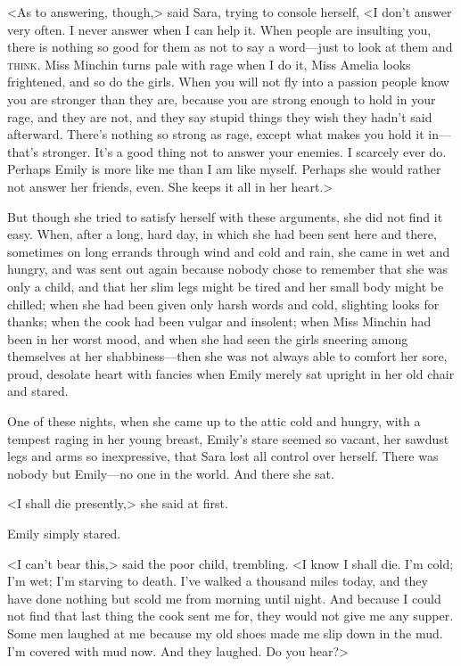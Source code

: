 <As to answering, though,> said Sara, trying to console herself, <I don't answer very often. I never answer when I can help it. When people are insulting you, there is nothing so good for them as not to say a word—just to look at them and \textsc{think}. Miss Minchin turns pale with rage when I do it, Miss Amelia looks frightened, and so do the girls. When you will not fly into a passion people know you are stronger than they are, because you are strong enough to hold in your rage, and they are not, and they say stupid things they wish they hadn't said afterward. There's nothing so strong as rage, except what makes you hold it in—that's stronger. It's a good thing not to answer your enemies. I scarcely ever do. Perhaps Emily is more like me than I am like myself. Perhaps she would rather not answer her friends, even. She keeps it all in her heart.>

But though she tried to satisfy herself with these arguments, she did not find it easy. When, after a long, hard day, in which she had been sent here and there, sometimes on long errands through wind and cold and rain, she came in wet and hungry, and was sent out again because nobody chose to remember that she was only a child, and that her slim legs might be tired and her small body might be chilled; when she had been given only harsh words and cold, slighting looks for thanks; when the cook had been vulgar and insolent; when Miss Minchin had been in her worst mood, and when she had seen the girls sneering among themselves at her shabbiness—then she was not always able to comfort her sore, proud, desolate heart with fancies when Emily merely sat upright in her old chair and stared.

One of these nights, when she came up to the attic cold and hungry, with a tempest raging in her young breast, Emily's stare seemed so vacant, her sawdust legs and arms so inexpressive, that Sara lost all control over herself. There was nobody but Emily—no one in the world. And there she sat.

<I shall die presently,> she said at first.

Emily simply stared.

<I can't bear this,> said the poor child, trembling. <I know I shall die. I'm cold; I'm wet; I'm starving to death. I've walked a thousand miles today, and they have done nothing but scold me from morning until night. And because I could not find that last thing the cook sent me for, they would not give me any supper. Some men laughed at me because my old shoes made me slip down in the mud. I'm covered with mud now. And they laughed. Do you hear?>

